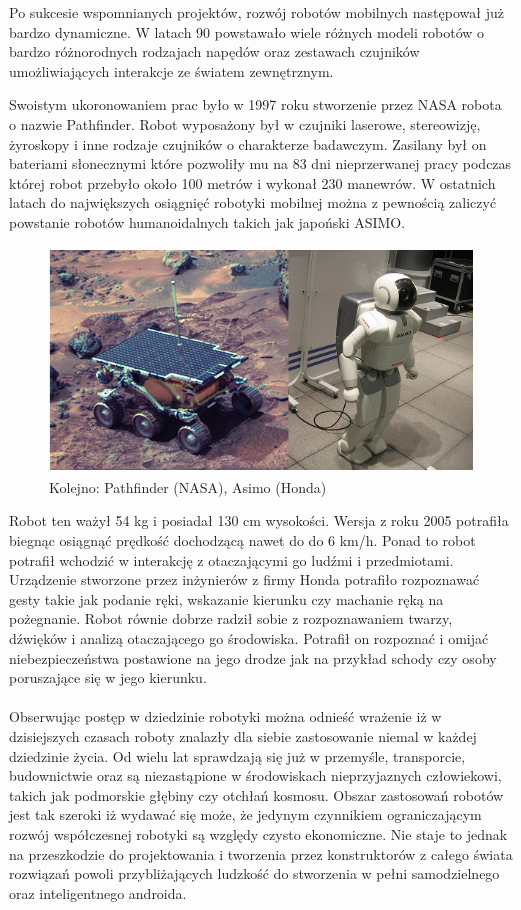 Po sukcesie wspomnianych projektów,
rozwój robotów mobilnych następował już bardzo dynamiczne. W latach 90
powstawało wiele różnych modeli robotów o bardzo różnorodnych rodzajach napędów
oraz zestawach czujników umożliwiających interakcje ze światem zewnętrznym.

\newpage
Swoistym ukoronowaniem prac było w 1997 roku stworzenie przez NASA robota o
nazwie Pathfinder. Robot wyposażony był w czujniki laserowe, stereowizję,
żyroskopy i inne rodzaje czujników o charakterze badawczym. Zasilany był on
bateriami słonecznymi które pozwoliły mu na 83 dni nieprzerwanej pracy podczas
której robot przebyło około 100 metrów i wykonał 230 manewrów. W ostatnich
latach do największych osiągnięć robotyki mobilnej można z pewnością zaliczyć
powstanie robotów humanoidalnych takich jak japoński ASIMO. 

\begin{figure}[hb]
 \centering
 \includegraphics[height=60mm]{../images/ch01/pathfinder_and_asimo.png}
 \caption{Kolejno: Pathfinder (NASA), Asimo (Honda)}
 \label{fig:RobotsHistory_Pathfinder_Asimo}
\end{figure}

Robot ten ważył 54 kg i posiadał 130 cm wysokości. Wersja z roku 2005 potrafiła
biegnąc osiągnąć prędkość dochodzącą nawet do do 6 km/h. Ponad to robot potrafił
wchodzić w interakcję z otaczającymi go ludźmi i przedmiotami. Urządzenie
stworzone przez inżynierów z firmy Honda potrafiło rozpoznawać gesty takie jak
podanie ręki, wskazanie kierunku czy machanie ręką na pożegnanie. Robot równie
dobrze radził sobie z rozpoznawaniem twarzy, dźwięków i analizą otaczającego go
środowiska. Potrafił on rozpoznać i omijać niebezpieczeństwa postawione na jego
drodze jak
na przykład schody czy osoby poruszające się w jego kierunku.\\
\\
Obserwując postęp w dziedzinie robotyki można odnieść wrażenie iż w dzisiejszych
czasach roboty znalazły dla siebie zastosowanie niemal w każdej dziedzinie życia.
Od wielu lat sprawdzają się już w przemyśle, transporcie, budownictwie oraz są
niezastąpione w środowiskach nieprzyjaznych człowiekowi, takich jak podmorskie
głębiny czy otchłań kosmosu. Obszar zastosowań robotów jest tak szeroki iż
wydawać się może, że jedynym czynnikiem ograniczającym rozwój współczesnej
robotyki są względy czysto ekonomiczne. Nie staje to jednak na przeszkodzie do
projektowania i tworzenia przez konstruktorów z całego świata rozwiązań powoli
przybliżających ludzkość do stworzenia w pełni samodzielnego oraz inteligentnego
androida.
